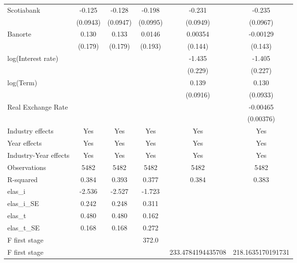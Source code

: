 {\begin{tabular}{l*{5}{c}}
Scotiabank      &   -0.125         &   -0.128         &   -0.198\sym{**} &   -0.231\sym{**} &   -0.235\sym{**} \\
                & (0.0943)         & (0.0947)         & (0.0995)         & (0.0949)         & (0.0967)         \\
Banorte         &    0.130         &    0.133         &   0.0146         &  0.00354         & -0.00129         \\
                &  (0.179)         &  (0.179)         &  (0.193)         &  (0.144)         &  (0.143)         \\
log(Interest rate)&                  &                  &                  &   -1.435\sym{***}&   -1.405\sym{***}\\
                &                  &                  &                  &  (0.229)         &  (0.227)         \\
log(Term)       &                  &                  &                  &    0.139         &    0.130         \\
                &                  &                  &                  & (0.0916)         & (0.0933)         \\
Real Exchange Rate&                  &                  &                  &                  & -0.00465         \\
                &                  &                  &                  &                  &(0.00376)         \\
Industry effects &      Yes         &      Yes         &      Yes         &      Yes         &      Yes         \\
Year effects    &      Yes         &      Yes         &      Yes         &      Yes         &      Yes         \\
Industry-Year effects &      Yes         &      Yes         &      Yes         &      Yes         &      Yes         \\
\hline
Observations    &     5482         &     5482         &     5482         &     5482         &     5482         \\
R-squared       &    0.384         &    0.393         &    0.377         &    0.384         &    0.383         \\
elas_i          &   -2.536         &   -2.527         &   -1.723         &                  &                  \\
elas_i_SE       &    0.242         &    0.248         &    0.311         &                  &                  \\
elas_t          &    0.480         &    0.480         &    0.162         &                  &                  \\
elas_t_SE       &    0.168         &    0.168         &    0.272         &                  &                  \\
F first stage   &                  &                  &    372.0         &                  &                  \\
F first stage   &                  &                  &                  &233.4784194435708         &218.1635170191731         \\
\hline\hline
\end{tabular}
}
